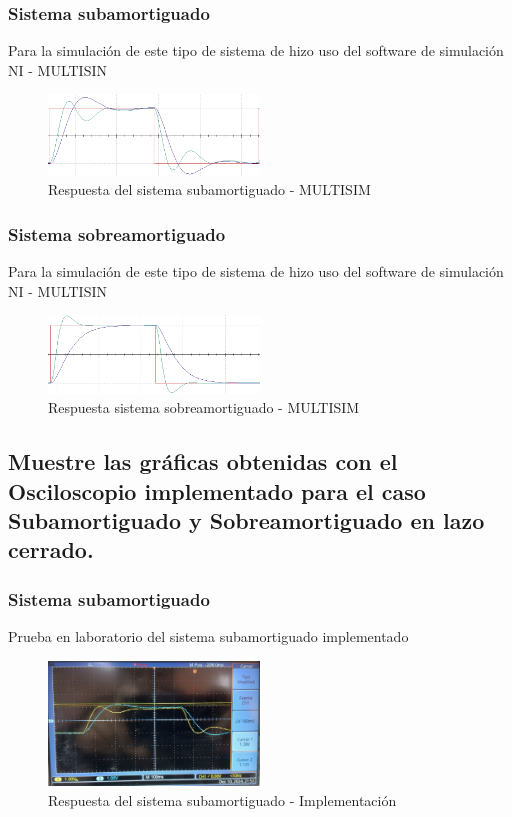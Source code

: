\documentclass[conference]{IEEEtran}
\begin{document}
	 \subsubsection{\textbf{Sistema subamortiguado}}
	 Para la simulación de este tipo de sistema de hizo uso del software de simulación NI - MULTISIN 
	 \begin{figure}[h]
	 	\centering
	 	\includegraphics[width=0.5\textwidth]{media/respuesta-sub-multi}
	 	\caption{Respuesta del sistema subamortiguado - MULTISIM}
	 	\label{fig:respuesta-sub-multi}
	 \end{figure}
	 
	 \subsubsection{\textbf{Sistema sobreamortiguado}}
	 Para la simulación de este tipo de sistema de hizo uso del software de simulación NI - MULTISIN 
	 \begin{figure}[h]
	 	\centering
	 	\includegraphics[width=0.5\textwidth]{media/respuesta-sobre-multi}
	 	\caption{Respuesta sistema sobreamortiguado - MULTISIM}
	 	\label{fig:respuesta-sobre-multi}
	 \end{figure}
	 
	 \subsection{\textbf{Muestre las gráficas obtenidas con el Osciloscopio implementado para el caso Subamortiguado y Sobreamortiguado en lazo cerrado.}}
	 
	 \subsubsection{\textbf{Sistema subamortiguado}}
	 Prueba en laboratorio del sistema subamortiguado implementado
	 \begin{figure}[h]
	 	\centering
	 	\includegraphics[width=0.5\textwidth]{media/respuesta-sub-implementacion}
	 	\caption{Respuesta del sistema subamortiguado - Implementación}
	 	\label{fig:respuesta-sub-implementacion}
	 \end{figure}
	 
\end{document}
